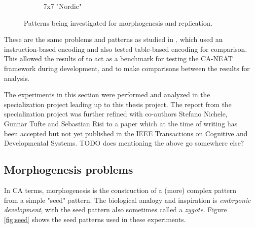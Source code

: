 \begin{figure}
\begin{subfigure}[b]{.20\textwidth}
\caption{7x7 "Nordic"}
\end{subfigure}%

\caption{Patterns being investigated for morphogenesis and replication.}
\label{fig:patterns}
\end{figure}

These are the same problems and patterns as studied in \cite{nichele2014evolutionary}, which used an instruction-based encoding and also tested table-based encoding for comparison.
This allowed the results of \cite{nichele2014evolutionary} to act as a benchmark for testing the CA-NEAT framework during development,
and to make comparisons between the results for analysis.

The experiments in this section were performed and analyzed in the specialization project leading up to this thesis project.
The report from the specialization project was further refined with co-authors Stefano Nichele, Gunnar Tufte and Sebastian Risi to a paper which at the time of writing has been accepted but not yet published in the IEEE Transactions on Cognitive and Developmental Systems.
TODO does mentioning the above go somewhere else?

\subsection{Morphogenesis problems}
\label{sec:morph_problems}
In CA terms, morphogenesis is the construction of a (more) complex pattern from a simple "seed" pattern.
The biological analogy and inspiration is \textit{embryonic development},
with the seed pattern also sometimes called a \textit{zygote}.
Figure \ref{fig:seed} shows the seed patterns used in these experiments.

